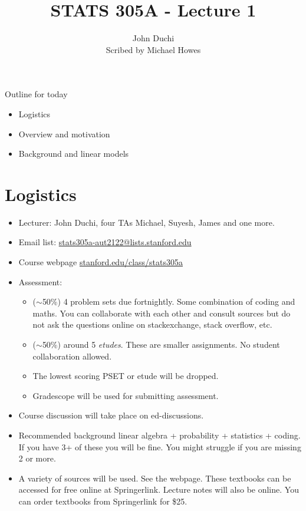 


\title{STATS 305A - Lecture 1}
\author{John Duchi\\
Scribed by Michael Howes}


\maketitle

Outline for today
\begin{itemize}
    \item Logistics
    \item Overview and motivation
    \item Background and linear models
\end{itemize}



\section{Logistics}
\begin{itemize}
    \item Lecturer: John Duchi, four TAs Michael, Suyesh, James and one more.
    \item Email list: \hyperlink{mailto:stats305a-aut2122@lists.stanford.edu}{stats305a-aut2122@lists.stanford.edu}
    \item Course webpage \hyperlink{stanford.edu/class/stats305a}{stanford.edu/class/stats305a}
    \item Assessment:
    \begin{itemize}
        \item  ($\sim$50\%) 4 problem sets due fortnightly. Some combination of coding and maths. You can collaborate with each other and consult sources but do not ask the questions online on stackexchange, stack overflow, etc.
        \item ($\sim$50\%) around 5 \emph{etudes}. These are smaller assignments. No student collaboration allowed.
        \item The lowest scoring PSET or etude will be dropped.
        \item Gradescope will be used for submitting assessment.
    \end{itemize}
    \item Course discussion will take place on ed-discussions.
    \item Recommended background linear algebra + probability + statistics + coding. If you have 3+ of these you will be fine. You might struggle if you are missing 2 or more.
    \item A variety of sources will be used. See the webpage. These textbooks can be accessed for free online at Springerlink. Lecture notes will also be online. You can order textbooks from Springerlink for \$25.
\end{itemize}



